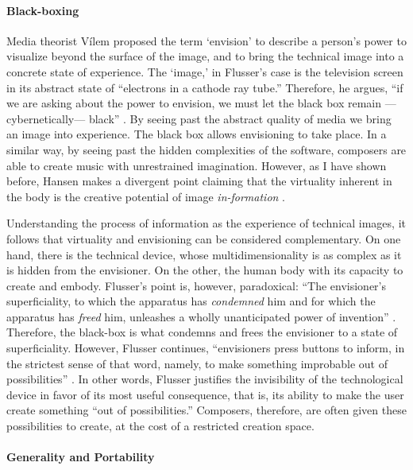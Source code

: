 \paragraph{Black-boxing}

Media theorist Vílem \textcite{Flu11:Int} proposed the term `envision' to describe a person's power to visualize beyond the surface of the image, and to bring the technical image into a concrete state of experience. The `image,' in Flusser's case is the television screen in its abstract state of ``electrons in a cathode ray tube.'' Therefore, he argues, ``if we are asking about the power to envision, we must let the black box remain ---cybernetically--- black'' \parencite[35]{Flu11:Int}. By seeing past the abstract quality of media we bring an image into experience. The black box allows envisioning to take place. In a similar way, by seeing past the hidden complexities of the software, composers are able to create music with unrestrained imagination. However, as I have shown before, Hansen makes a divergent point claiming that the virtuality inherent in the body is the creative potential of image \textit{in-formation} . 

Understanding the process of information as the experience of technical images, it follows that virtuality and envisioning can be considered complementary. On one hand, there is the technical device, whose multidimensionality is as complex as it is hidden from the envisioner. On the other, the human body with its capacity to create and embody. Flusser's point is, however, paradoxical: ``The envisioner's superficiality, to which the apparatus has \textit{condemned} him and for which the apparatus has \textit{freed} him, unleashes a wholly unanticipated power of invention'' \im \parencite[37]{Flu11:Int}. Therefore, the black-box is what condemns and frees the envisioner to a state of superficiality. However, Flusser continues, ``envisioners press buttons to inform, in the strictest sense of that word, namely, to make something improbable out of possibilities'' \parencite[37]{Flu11:Int}. In other words, Flusser justifies the invisibility of the technological device in favor of its most useful consequence, that is, its ability to make the user create something ``out of possibilities.'' Composers, therefore, are often given these possibilities to create, at the cost of a restricted creation space.

\paragraph{Generality and Portability}
\label{computer:free}

